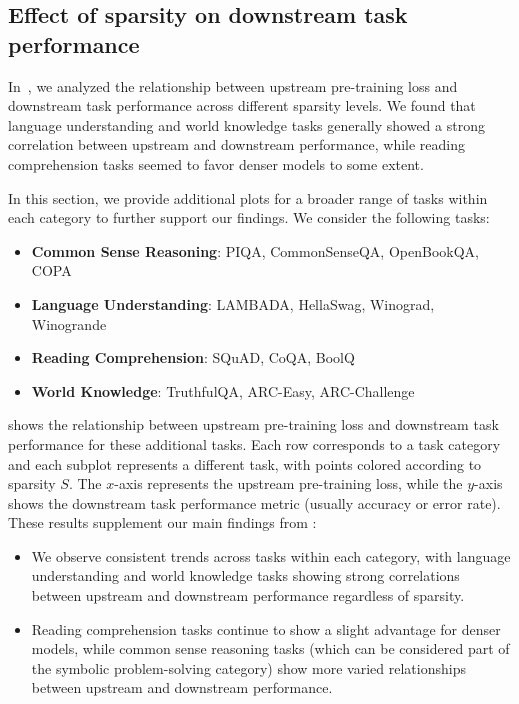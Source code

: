 \subsection{Effect of sparsity on downstream task performance}
\label{app:downstream}

In~, we analyzed the relationship between upstream pre-training loss and downstream task performance across different \moe sparsity levels. We found that language understanding and world knowledge tasks generally showed a strong correlation between upstream and downstream performance, while reading comprehension tasks seemed to favor denser models to some extent. 

In this section, we provide additional plots for a broader range of tasks within each category to further support our findings. We consider the following tasks:
\begin{itemize}[left=0pt,itemsep=2pt]
\item \textbf{Common Sense Reasoning}: PIQA, CommonSenseQA, OpenBookQA, COPA
\item \textbf{Language Understanding}: LAMBADA, HellaSwag, Winograd, Winogrande
\item \textbf{Reading Comprehension}: SQuAD, CoQA, BoolQ
\item \textbf{World Knowledge}: TruthfulQA, ARC-Easy, ARC-Challenge
\end{itemize}
 shows the relationship between upstream pre-training loss and downstream task performance for these additional tasks. Each row corresponds to a task category and each subplot represents a different task, with points colored according to \moe sparsity $S$. The $x$-axis represents the upstream pre-training loss, while the $y$-axis shows the downstream task performance metric (usually accuracy or error rate). These results supplement our main findings from :
\begin{itemize}[left=0pt,itemsep=2pt]
    \item We observe consistent trends across tasks within each category, with language understanding and world knowledge tasks showing strong correlations between upstream and downstream performance regardless of sparsity. 
    \item Reading comprehension tasks continue to show a slight advantage for denser models, while common sense reasoning tasks (which can be considered part of the symbolic problem-solving category) show more varied relationships between upstream and downstream performance.
\end{itemize}

